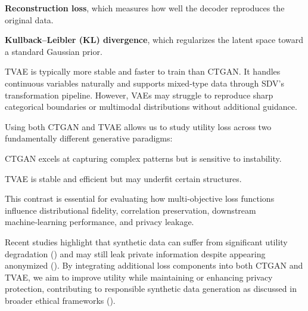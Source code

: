 \documentclass[11pt]{article}
\begin{document}
\textbf{Reconstruction loss}, which measures how well the decoder reproduces the original data.

\textbf{Kullback–Leibler (KL) divergence}, which regularizes the latent space toward a standard Gaussian prior.

TVAE is typically more stable and faster to train than CTGAN. It handles continuous variables naturally and supports mixed‑type data through SDV’s transformation pipeline. However, VAEs may struggle to reproduce sharp categorical boundaries or multimodal distributions without additional guidance.

Using both CTGAN and TVAE allows us to study utility loss across two fundamentally different generative paradigms:

CTGAN excels at capturing complex patterns but is sensitive to instability.

TVAE is stable and efficient but may underfit certain structures.

This contrast is essential for evaluating how multi‑objective loss functions influence distributional fidelity, correlation preservation, downstream machine‑learning performance, and privacy leakage.

Recent studies highlight that synthetic data can suffer from significant utility degradation (\cite{little2025synthetic}) and may still leak private information despite appearing anonymized (\cite{stadler2022synthetic}). By integrating additional loss components into both CTGAN and TVAE, we aim to improve utility while maintaining or enhancing privacy protection, contributing to responsible synthetic data generation as discussed in broader ethical frameworks (\cite{leslie2020ethics, floridi2016data}).
\end{document}
